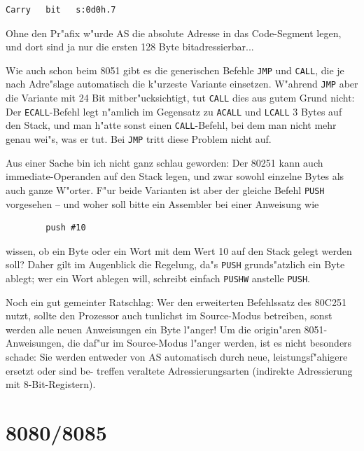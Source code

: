 \documentclass[12pt,a4paper,twoside]{report}
\newcommand{\tty}[1]{{\tt #1}}
\newcommand{\asname}{AS}
\begin{document}
\begin{verbatim}
Carry   bit   s:0d0h.7
\end{verbatim}
Ohne den Pr"afix w"urde \asname{} die absolute Adresse in das Code-Segment
legen, und dort sind ja nur die ersten 128 Byte bitadressierbar...
\par
Wie auch schon beim 8051 gibt es die generischen Befehle \tty{JMP} und
\tty{CALL}, die je nach Adre"slage automatisch die k"urzeste Variante
einsetzen.  W"ahrend \tty{JMP} aber die Variante mit 24 Bit mitber"ucksichtigt,
tut \tty{CALL} dies aus gutem Grund nicht: Der \tty{ECALL}-Befehl legt
n"amlich im Gegensatz zu \tty{ACALL} und \tty{LCALL} 3 Bytes auf den
Stack, und man h"atte sonst einen \tty{CALL}-Befehl, bei dem man nicht
mehr genau wei"s, was er tut.  Bei \tty{JMP} tritt diese Problem nicht auf.
\par
Aus einer Sache bin ich nicht ganz schlau geworden: Der 80251 kann
auch immediate-Operanden auf den Stack legen, und zwar sowohl einzelne
Bytes als auch ganze W"orter.  F"ur beide Varianten ist aber der gleiche
Befehl \tty{PUSH} vorgesehen -- und woher soll bitte ein Assembler bei
einer Anweisung wie
\begin{verbatim}
        push #10
\end{verbatim}
wissen, ob ein Byte oder ein Wort mit dem Wert 10 auf den Stack gelegt
werden soll?  Daher gilt im Augenblick die Regelung, da"s \tty{PUSH}
grunds"atzlich ein Byte ablegt; wer ein Wort ablegen will, schreibt
einfach \tty{PUSHW} anstelle \tty{PUSH}.
\par
Noch ein gut gemeinter Ratschlag: Wer den erweiterten Befehlssatz des
80C251 nutzt, sollte den Prozessor auch tunlichst im Source-Modus
betreiben, sonst werden alle neuen Anweisungen ein Byte l"anger!  Um
die origin"aren 8051-Anweisungen, die daf"ur im Source-Modus l"anger
werden, ist es nicht besonders schade: Sie werden entweder von \asname{}
automatisch durch neue, leistungsf"ahigere ersetzt oder sind be-
treffen veraltete Adressierungsarten (indirekte Adressierung mit
8-Bit-Registern).


\section{8080/8085}
\label{8080Spec}
\end{document}

